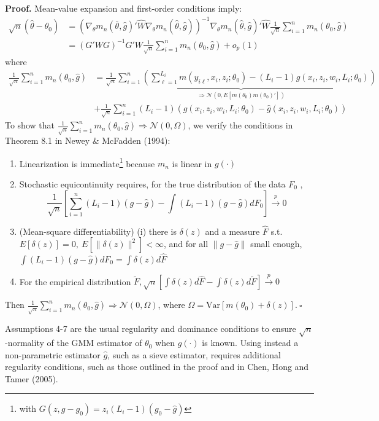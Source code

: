 \documentclass[12pt]{article}
\newcommand{\toP}{\overset{p}{\to}}
\begin{document}
\textbf{Proof.} Mean-value expansion and first-order conditions imply:
\begin{align*} \sqrt{n}(\hat{\theta}-\theta_0) &= (\nabla_{\theta}m_n(\bar{\theta},\hat{g})' \hat{W} \nabla_{\theta} m_n(\hat{\theta},\hat{g}))^{-1}  \nabla_{\theta} m_n(\hat{\theta},\hat{g})' \hat{W} \frac{1}{\sqrt{n}}\sum_{i=1}^n m_n(\theta_0,\hat{g})\\
&= (G'WG)^{-1}G'W\frac{1}{\sqrt{n}}\sum_{i=1}^n m_n(\theta_0,\hat{g}) + o_p(1)
\end{align*}
where \begin{align*}
     \frac{1}{\sqrt{n}} \sum_{i=1}^n m_n(\theta_0,\hat{g}) &= \underbrace{\frac{1}{\sqrt{n}} \sum_{i=1}^n \left( \sum_{\ell =1}^{L_i} m(y_{i\ell}, x_i, z_i; \theta_0) - (L_i - 1) g(x_i,z_i, w_i, L_i; \theta_0)\right)}_{\Rightarrow \mathcal{N}(0, E[m(\theta_0)m(\theta_0)'])}  \\&+ \frac{1}{\sqrt{n}}\sum_{i=1}^n (L_i-1)\left(g(x_i,z_i,w_i,L_i; \theta_0) - \hat{g}(x_i,z_i,w_i,L_i;\theta_0)\right)  
 \end{align*}
To show that $\frac{1}{\sqrt{n}}\sum_{i=1}^n m_n(\theta_0,\hat{g}) \Rightarrow \mathcal{N}(0, \Omega)$, we verify the conditions in Theorem 8.1 in Newey \& McFadden (1994):

\begin{enumerate}
    \item Linearization is immediate\footnote{with $G(z,g-g_0) = z_i(L_i-1)(g_0-\hat{g})$} because $m_n$ is linear in $g(\cdot)$
    \item Stochastic equicontinuity requires, for the true distribution of the data $F_0$ , 
    $$\frac{1}{\sqrt{n}}\left[\sum_{i=1}^n  (L_i-1)(g-\hat{g}) - \int (L_i-1)(g-\hat{g}) d F_0 \right] \toP 0 $$ 
    \item (Mean-square differentiability) (i) there is $\delta(z)$ and a measure $\hat{F}$ s.t. $E[\delta(z)] = 0, \ E[\lVert \delta(z)\rVert^2] < \infty $, and for all $\lVert g-\hat{g}\rVert$ small enough, $\int (L_i-1)(g-\hat{g})dF_0 = \int \delta(z) d \hat{F}$
    \item For the empirical distribution $\tilde{F}, \sqrt{n}\left[\int \delta(z)d\hat{F} - \int \delta(z) d\tilde{F}\right] \toP 0$
\end{enumerate}

Then $\frac{1}{\sqrt{n}}\sum_{i=1}^n m_n(\theta_0,\hat{g}) \Rightarrow \mathcal{N}(0, \Omega)$, where $\Omega = \text{Var}[m(\theta_0) + \delta(z)].\ \square$

 

Assumptions 4-7 are the usual regularity and dominance conditions to ensure $\sqrt{n}$-normality of the GMM estimator of $\theta_0$ when $g(\cdot)$ is known.  Using instead a non-parametric estimator $\hat{g}$, such as a sieve estimator, requires additional regularity conditions, such as those outlined in the proof and in Chen, Hong and Tamer (2005). 
\end{document}
